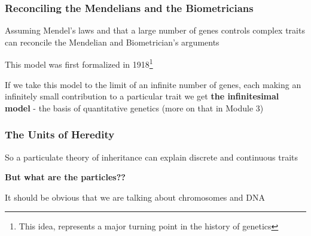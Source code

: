 \documentclass{beamer}
\begin{document}
\begin{frame}
	\frametitle{Reconciling the Mendelians and the Biometricians}

Assuming Mendel's laws and that a large number of genes controls complex traits can reconcile the Mendelian and Biometrician's arguments \\

\bigskip

This model was first formalized in 1918\footnote[1]{This idea, represents a major turning point in the history of genetics} \\

\bigskip

If we take this model to the limit of an infinite number of genes, each making an infinitely small contribution to a particular trait we get \textbf{the infinitesimal model} - the basis of quantitative genetics (more on that in Module 3) 

\end{frame}


\begin{frame}

	\frametitle{The Units of Heredity}
	
	So a particulate theory of inheritance can explain discrete and continuous traits\\
	\bigskip
	
	\textbf{But what are the particles??} \pause

\tiny It should be obvious that we are talking about chromosomes and DNA	
	
	
	
\end{frame}



\end{document}
